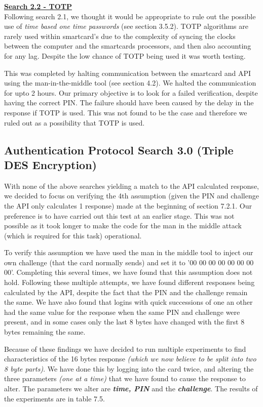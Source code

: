 \documentclass[bsc,frontabs,twoside,singlespacing,parskip,deptreport]{infthesis}     %
\begin{document}
\textbf{\underline{Search 2.2 - TOTP}}\\
Following search 2.1, we thought it would be appropriate to rule out the possible use of \textit{time based one time passwords} (see section 3.5.2). TOTP algorithms are rarely used within smartcard's due to the complexity of syncing the clocks between the computer and the smartcards processors, and then also accounting for any lag. Despite the low chance of TOTP being used it was worth testing.

This was completed by halting communication between the smartcard and API using the man-in-the-middle tool (see section 4.2). We halted the communication for upto 2 hours. Our primary objective is to look for a failed verification, despite having the correct PIN. The failure should have been caused by the delay in the response if TOTP is used. This was not found to be the case and therefore we ruled out as a possibility that TOTP is used.

\subsection{Authentication Protocol Search 3.0 (Triple DES Encryption)}

With none of the above searches yielding a match to the API calculated response, we decided to focus on verifying the 4th assumption (given the PIN and challenge the API only calculates 1 response) made at the beginning of section 7.2.1. Our preference is to have carried out this test at an earlier stage. This was not possible as it took longer to make the code for the man in the middle attack (which is required for this task) operational. 

To verify this assumption we have used the man in the middle tool to inject our own challenge (that the card normally sends) and set it to '00 00 00 00 00 00 00 00'. Completing this several times, we have found that this assumption does not hold. Following these multiple attempts, we have found different responses being calculated by the API, despite the fact that the PIN and the challenge remain the same. We have also found that logins with quick successions of one an other had the same value for the response when the same PIN and challenge were present, and in some cases only the last 8 bytes have changed with the first 8 bytes remaining the same.

Because of these findings we have decided to run multiple experiments to find characteristics of the 16 bytes response \textit{(which we now believe to be split into two 8 byte parts)}. We have done this by logging into the card twice, and altering the three parameters \textit{(one at a time)} that we have found to cause the response to alter. The parameters we alter are \textbf{\textit{time, PIN}} and the \textbf{\textit{challenge}}. The results of the experiments are in table 7.5.
\end{document}

